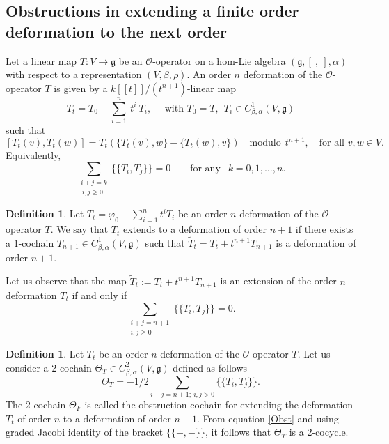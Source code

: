 \documentclass[a4paper,11pt]{amsart}
\theoremstyle{plain}
\theoremstyle{definition}
\newtheorem{definition}[theorem]{Definition}
\theoremstyle{remark}
\numberwithin{equation}{section}
\begin{document}
\subsection{Obstructions in extending a finite order deformation to the next order}

Let a linear map $T:V\rightarrow \mathfrak{g}$ be an $\mathcal{O}$-operator on a hom-Lie algebra $(\mathfrak{g},[~,~],\alpha)$ with respect to a representation $(V,\beta,\rho)$. An order $n$ deformation of the $\mathcal{O}$-operator $T$ is given by a $k[[t]]/(t^{n+1})$-linear map 
$${T_t=T_0+\sum\limits^n_{i=1}~t^i ~T_i }, \quad\mbox{ with  }  T_0=T,~~T_i\in C^1_{\beta,\alpha}(V,\mathfrak{g})$$ 
such that 
$$[T_t(v),T_t(w)]=T_t(\{T_t(v),w\}-\{T_t(w),v\}) \quad\mbox{modulo}~~ t^{n+1}, \quad \mbox{for all }v,w\in V.$$
Equivalently,
$$\sum\limits_{\substack{i+j=k\\ ~i,j\geq 0}}\{\!\!\{T_i,T_j\}\!\!\}=0\quad\quad\mbox{for any }~~k=0,1,\ldots,n.$$

\begin{definition}
Let $\textstyle{T_t=\varphi_0+\sum^n_{i=1}t^i T_i }$ be an order $n$ deformation of the $\mathcal{O}$-operator $T$. We say that $T_t$ extends to a deformation of order $n+1$ if there exists a $1$-cochain $T_{n+1}\in C^1_{\beta,\alpha}(V,\mathfrak{g})$ such that $\widetilde{T}_t=T_t+t^{n+1} T_{n+1} $ is a deformation of order $n+1$.
\end{definition}

Let us observe that the map $\widetilde{T}_t:=T_t+t^{n+1}T_{n+1}$ is an extension of the order $n$ deformation $T_t$ if and only if 
$$\sum_{\substack{i+j=n+1\\i,j\geq 0}}\{\!\!\{T_i,T_j\}\!\!\}=0.$$


\begin{definition}
Let $T_t$ be an order $n$ deformation of the $\mathcal{O}$-operator $T$. Let us consider a $2$-cochain $\Theta_T \in C^2_{\beta,\alpha}(V,\mathfrak{g})$ defined as follows
\begin{equation}\label{Obst}
\Theta_T =-1/2\sum_{i+j=n+1;~i,j>0}\{\!\!\{T_i,T_j\}\!\!\}.
\end{equation}
The $2$-cochain $\Theta_F$ is called the obstruction cochain for extending the deformation $T_t$ of order $n$ to a deformation of order $n+1$. 
From equation \eqref{Obst} and using graded Jacobi identity of the bracket $\{\!\!\{-,-\}\!\!\}$, it follows that $\Theta_T$ is a $2$-cocycle.
\end{definition}
\end{document}

